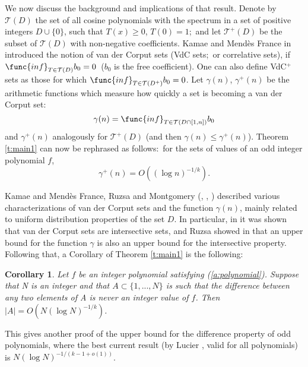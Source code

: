 \documentclass{amsart}
\newtheorem {corollary}{Corollary}
\numberwithin {equation}{section}
\begin{document}
We now discuss the background and implications of that result. Denote by ${\mathcal{T}}(D)$ the set of all cosine polynomials with the spectrum in a
set of positive integers $D\cup \{0\}$, such that $T(x)\geq 0$, $T(0)=1$;\
and let ${\mathcal{T}}^{+}(D)$ be the subset of ${\mathcal{T}}(D)$ with
non-negative coefficients. Kamae and Mend\`{e}s France in \cite{Kamae:77}
introduced the notion of van der Corput sets (VdC sets;\ or correlative
sets), if $\func{inf}_{T\in {\mathcal{T}}(D)}b_{0}=0\,\ $($b_{0}$ is the
free coefficient). One can also define VdC$^{+}$ sets as those for which $\func{inf}_{T\in {\mathcal{T}}(D^{+})}b_{0}=0$. Let $\gamma (n)$, $\gamma
^{+}(n)$ be the arithmetic functions which measure how quickly a set is
becoming a van der Corput set: 
\begin{equation*}
\gamma (n)= \func{inf}_{T\in {\mathcal{T}}(D\cap \lbrack 1,n])}b_{0}
\end{equation*}
and $\gamma ^{+}(n)$ analogously for ${\mathcal{T}}^{+}(D)$ (and then $\gamma (n)\leq \gamma ^{+}(n)$). Theorem \ref{t:main1} can now be rephrased
as follows:\ for the sets of values of an odd integer polynomial $f$, 
\begin{equation}
\gamma ^{+}(n)=O((\log n)^{-1/k}).  \label{r:bound1}
\end{equation}

Kamae and Mend\`{e}s France, Ruzsa and Montgomery (\cite{Montgomery:94}, 
\cite{Ruzsa:81}, \cite{Ruzsa:84a}) described various characterizations of
van der Corput sets and the function $\gamma (n)$, mainly related to uniform
distribution properties of the set $D$. In particular, in \cite{Kamae:77} it
was shown that van der Corput sets are intersective sets, and Ruzsa showed
in \cite{Ruzsa:84a} that an upper bound for the function $\gamma $ is also
an upper bound for the intersective property. Following that, a Corollary of
Theorem \ref{t:main1} is the following:

\begin{corollary}
Let $f$ be an integer polynomial satisfying (\ref{a:polynomial}). Suppose
that N is an integer and that $A\subset \{1,...,N\}$ is such that the
difference between any two elements of A is never an integer value of $f$.
Then $|A|=O(N(\log N)^{-1/k})$.
\end{corollary}

This gives another proof of the upper bound for the difference property of
odd polynomials, where the best current result (by Lucier \cite{Lucier:07},
valid for all polynomials) is $N(\log N)^{-1/(k-1+o(1))}$.
\end{document}
